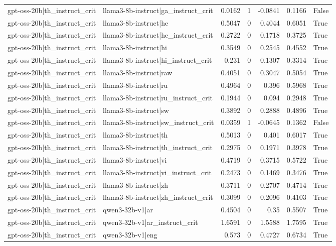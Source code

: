 \begin{table}
\begin{tabular}{l l r r r r l}
gpt-oss-20b|th_instruct_crit & llama3-8b-instruct|ga_instruct_crit & 0.0162 & 1 & -0.0841 & 0.1166 & False \\
gpt-oss-20b|th_instruct_crit & llama3-8b-instruct|he & 0.5047 & 0 & 0.4044 & 0.6051 & True \\
gpt-oss-20b|th_instruct_crit & llama3-8b-instruct|he_instruct_crit & 0.2722 & 0 & 0.1718 & 0.3725 & True \\
gpt-oss-20b|th_instruct_crit & llama3-8b-instruct|hi & 0.3549 & 0 & 0.2545 & 0.4552 & True \\
gpt-oss-20b|th_instruct_crit & llama3-8b-instruct|hi_instruct_crit & 0.231 & 0 & 0.1307 & 0.3314 & True \\
gpt-oss-20b|th_instruct_crit & llama3-8b-instruct|raw & 0.4051 & 0 & 0.3047 & 0.5054 & True \\
gpt-oss-20b|th_instruct_crit & llama3-8b-instruct|ru & 0.4964 & 0 & 0.396 & 0.5968 & True \\
gpt-oss-20b|th_instruct_crit & llama3-8b-instruct|ru_instruct_crit & 0.1944 & 0 & 0.094 & 0.2948 & True \\
gpt-oss-20b|th_instruct_crit & llama3-8b-instruct|sw & 0.3892 & 0 & 0.2888 & 0.4896 & True \\
gpt-oss-20b|th_instruct_crit & llama3-8b-instruct|sw_instruct_crit & 0.0359 & 1 & -0.0645 & 0.1362 & False \\
gpt-oss-20b|th_instruct_crit & llama3-8b-instruct|th & 0.5013 & 0 & 0.401 & 0.6017 & True \\
gpt-oss-20b|th_instruct_crit & llama3-8b-instruct|th_instruct_crit & 0.2975 & 0 & 0.1971 & 0.3978 & True \\
gpt-oss-20b|th_instruct_crit & llama3-8b-instruct|vi & 0.4719 & 0 & 0.3715 & 0.5722 & True \\
gpt-oss-20b|th_instruct_crit & llama3-8b-instruct|vi_instruct_crit & 0.2473 & 0 & 0.1469 & 0.3476 & True \\
gpt-oss-20b|th_instruct_crit & llama3-8b-instruct|zh & 0.3711 & 0 & 0.2707 & 0.4714 & True \\
gpt-oss-20b|th_instruct_crit & llama3-8b-instruct|zh_instruct_crit & 0.3099 & 0 & 0.2096 & 0.4103 & True \\
gpt-oss-20b|th_instruct_crit & qwen3-32b-v1|ar & 0.4504 & 0 & 0.35 & 0.5507 & True \\
gpt-oss-20b|th_instruct_crit & qwen3-32b-v1|ar_instruct_crit & 1.6591 & 0 & 1.5588 & 1.7595 & True \\
gpt-oss-20b|th_instruct_crit & qwen3-32b-v1|eng & 0.573 & 0 & 0.4727 & 0.6734 & True \\

\end{tabular}
\end{table}
